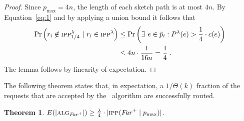 \documentclass[11pt]{article}
\newtheorem{theorem}{Theorem}
\newcommand{\route}{\text{\sc{ipp}}}
\newcommand{\IPP}{\route}
\newcommand{\pmax}{p_{\max}}
\newcommand{\alg}{\text{\sc{alg}}}
\newenvironment{proof sketch}[1]{\noindent {\emph{Proof sketch of #1:}}}{\hfill \qed}
\newcommand{\far}{\text{\emph{Far}}}
\newcommand{\algf}{\alg_{\far^+}}
\newcommand{\RIPP}{\IPP(\far^+ \mid \pmax)}\newcommand{\RIPPt}{\IPP^{\lambda}}
\newcommand{\Rinj}{\RIPPt_{1/4}}
\newcommand{\algfar}{\algf}
\begin{document}
\begin{proof}
Since $\pmax=4n$, the length of each sketch path is at most $4n$.  By
    Equation~\eqref{eq:1} and by applying a union bound it follows that
\begin{align*}
  \Pr \left(r_{i} \not\in \Rinj ~|~ r_i \in \RIPPt\right) & \leq \Pr \left( \exists~ e \in \hat p_i : P^{\lambda}(e) > \frac 14 \cdot c (e)\right) \\
  &\leq 4n \cdot \frac 1{16n} = \frac 14\:.
\end{align*}
The lemma follows by linearity of expectation.
\end{proof}

The following theorem states that, in expectation, a $1/\Theta(k)$ fraction
of the requests that are accepted by the \route\ algorithm are successfully routed.
\begin{theorem}\label{theorem:Rinjt}
  $E(|\algfar|)\geq \frac \lambda 4 \cdot |\RIPP|$.
\end{theorem}
\end{document}
